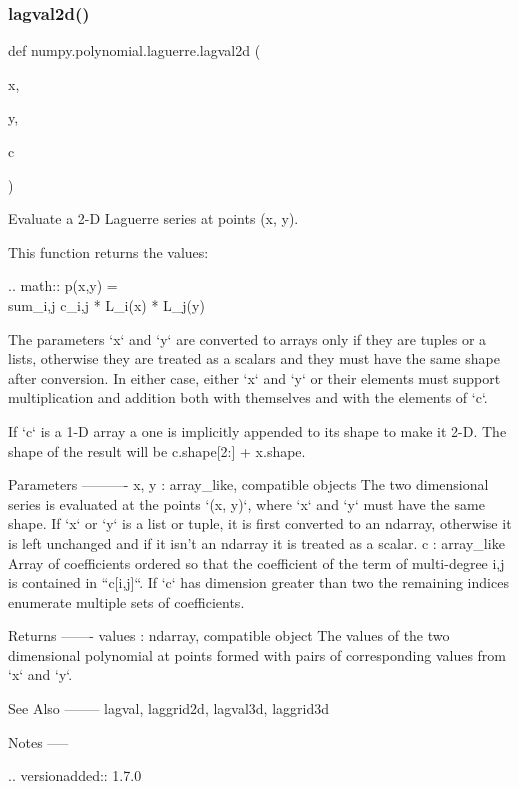 \subsubsection{\texorpdfstring{lagval2d()}{lagval2d()}}
{\footnotesize\ttfamily def numpy.\+polynomial.\+laguerre.\+lagval2d (\begin{DoxyParamCaption}\item[{}]{x,  }\item[{}]{y,  }\item[{}]{c }\end{DoxyParamCaption})}

\begin{DoxyVerb}Evaluate a 2-D Laguerre series at points (x, y).

This function returns the values:

.. math:: p(x,y) = \\sum_{i,j} c_{i,j} * L_i(x) * L_j(y)

The parameters `x` and `y` are converted to arrays only if they are
tuples or a lists, otherwise they are treated as a scalars and they
must have the same shape after conversion. In either case, either `x`
and `y` or their elements must support multiplication and addition both
with themselves and with the elements of `c`.

If `c` is a 1-D array a one is implicitly appended to its shape to make
it 2-D. The shape of the result will be c.shape[2:] + x.shape.

Parameters
----------
x, y : array_like, compatible objects
    The two dimensional series is evaluated at the points `(x, y)`,
    where `x` and `y` must have the same shape. If `x` or `y` is a list
    or tuple, it is first converted to an ndarray, otherwise it is left
    unchanged and if it isn't an ndarray it is treated as a scalar.
c : array_like
    Array of coefficients ordered so that the coefficient of the term
    of multi-degree i,j is contained in ``c[i,j]``. If `c` has
    dimension greater than two the remaining indices enumerate multiple
    sets of coefficients.

Returns
-------
values : ndarray, compatible object
    The values of the two dimensional polynomial at points formed with
    pairs of corresponding values from `x` and `y`.

See Also
--------
lagval, laggrid2d, lagval3d, laggrid3d

Notes
-----

.. versionadded:: 1.7.0\end{DoxyVerb}
 \mbox{\label{namespacenumpy_1_1polynomial_1_1laguerre_add65fabd72f37217cedda99a89d96434}} 
